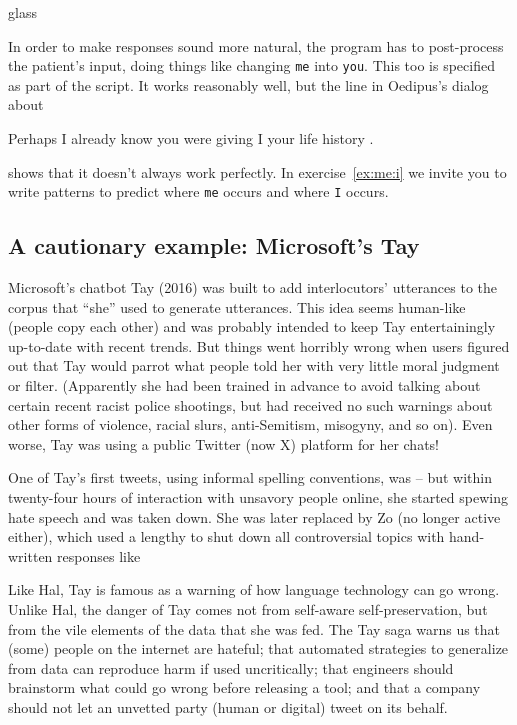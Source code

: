 \begin{tblsfilledsymbol}{}{glass}
\begin{underthehood}
In order to make responses sound more natural, the program has to post-process the patient's input, doing things like changing \texttt{me} into \texttt{you}. This too is specified as part of the script. It works reasonably well, but the line in Oedipus's dialog about

\begin{dialogue}
  Perhaps I already know you were giving I your life history .
\end{dialogue}

shows that it doesn't always work perfectly.
In exercise~\ref{ex:me:i} we invite you to write patterns to predict where \texttt{me} occurs and where \texttt{I} occurs.

\end{underthehood}
\end{tblsfilledsymbol}

\subsection{A cautionary example: Microsoft's Tay}


Microsoft's chatbot Tay (2016) was built to add interlocutors' utterances to the corpus that ``she'' used to generate utterances.  This idea seems human-like (people copy each other) and was probably intended to keep Tay entertainingly up-to-date with recent trends.    But things went horribly wrong when users figured out that Tay would parrot what people told her with very little moral judgment or filter.  (Apparently she had been trained in advance to avoid talking about certain recent racist police shootings, but had received no such warnings about other forms of violence, racial slurs, anti-Semitism, misogyny, and so on).
Even worse, Tay was using a public Twitter (now X) platform for her chats!  

One of Tay's first tweets, using informal spelling conventions, was  -- but within twenty-four hours of interaction with unsavory people online, she started spewing hate speech and was taken down.  She was later replaced by Zo (no longer active either), which used a lengthy  to shut down all controversial topics with hand-written responses like 

Like Hal, Tay is famous as a warning of how language technology can go wrong.  Unlike Hal, the danger of Tay comes not from self-aware self-preservation, but from the vile elements of the data that she was fed.   The Tay saga warns us that (some) people on the internet are hateful; that automated strategies to generalize from data can reproduce harm if used uncritically; that engineers should brainstorm what could go wrong before releasing a tool; and that a company should not let an unvetted party (human or digital) tweet  on its behalf.




